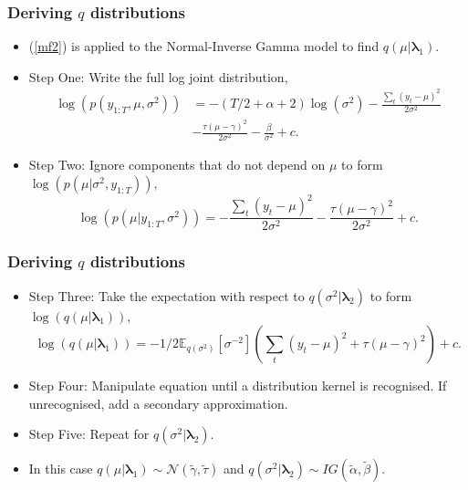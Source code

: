 \documentclass{beamer}\usepackage[]{graphicx}\usepackage[]{color}
\begin{document}
\begin{frame}
\frametitle{Deriving $q$ distributions}
\begin{itemize}
\item (\ref{mf2}) is applied to the Normal-Inverse Gamma model to find $q(\mu | \boldsymbol{\lambda}_1)$.
\item Step One: Write the full log joint distribution,
\begin{align}
\log(p(y_{1:T}, \mu, \sigma^2)) &= -(T/2 + \alpha + 2)\log(\sigma^2) - \frac{\sum_{t}(y_t - \mu)^2}{2\sigma^2} \nonumber \\
&- \frac{\tau(\mu - \gamma)^2}{2\sigma^2} - \frac{\beta}{\sigma^2} + c. \nonumber 
\end{align}
\item Step Two: Ignore components that do not depend on $\mu$ to form $\log(p(\mu | \sigma^2, y_{1:T})),$
\begin{equation}
\log(p(\mu | y_{1:T}, \sigma^2)) = - \frac{\sum_{t}(y_t - \mu)^2}{2\sigma^2} - \frac{\tau(\mu - \gamma)^2}{2\sigma^2} + c. \nonumber
\end{equation}
\end{itemize}
\end{frame}


\begin{frame}
\frametitle{Deriving $q$ distributions}
\begin{itemize}
\item Step Three: Take the expectation with respect to $q(\sigma^2 | \boldsymbol{\lambda}_2)$ to form $\log(q(\mu | \boldsymbol{\lambda}_1)),$
\begin{equation}
\log(q(\mu | \boldsymbol{\lambda}_1)) = - 1/2 \mathbb{E}_{q(\sigma^2)} [\sigma^{-2}] \left( \sum_{t}(y_t - \mu)^2 + \tau(\mu - \gamma)^2 \right)  + c. \nonumber
\end{equation}
\item Step Four: Manipulate equation until a distribution kernel is recognised. If unrecognised, add a secondary approximation.
\item Step Five: Repeat for $q(\sigma^2 | \boldsymbol{\lambda}_2)$.
\item In this case $q(\mu | \boldsymbol{\lambda}_1) \sim \mathcal{N}(\tilde{\gamma}, \tilde{\tau})$ and $q(\sigma^2 | \boldsymbol{\lambda}_2) \sim IG(\tilde{\alpha}, \tilde{\beta})$.
\end{itemize}
\end{frame}
\end{document}
